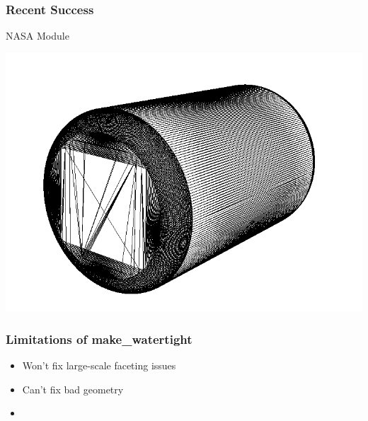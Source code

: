 \documentclass[14pt]{beamer}
\begin{document}
\begin{frame}
\frametitle{Recent Success}

NASA Module
\begin{center}
\includegraphics[scale=0.35]{bad_facets.png}
\end{center}
\end{frame}

\begin{frame}
\frametitle{Limitations of make\_watertight}
\begin{itemize}
\item Won't fix large-scale faceting issues
\item Can't fix bad geometry
\item 
\end{itemize}
\end{frame}
\end{document}

